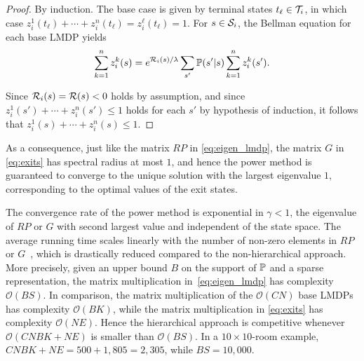 \begin{proof}
By induction. The base case is given by terminal states $t_\ell\in\mathcal{T}_i$, in which case $z_i^1(t_\ell)+\cdots+z_i^n(t_\ell) = z_i^\ell(t_\ell) = 1$. For $s\in\mathcal{S}_i$, the Bellman equation for each base LMDP yields
\begin{align*}
    \sum_{k=1}^n z_i^k(s)=e^{\mathcal{R}_i(s)/\lambda}\sum_{s'}\mathbb{P}(s'|s)\sum_{k=1}^n z_i^k(s').
\end{align*}


Since $\mathcal{R}_i(s)=\mathcal{R}(s)<0$ holds by assumption, and since $z_i^1(s')+\cdots+z_i^n(s')\leq 1$ holds for each $s'$ by hypothesis of induction, it follows that $z_i^1(s)+\cdots+z_i^n(s)\leq 1$.
\end{proof}
As a consequence, just like the matrix $RP$ in \eqref{eq:eigen_lmdp}, the matrix $G$ in \eqref{eq:exits} has spectral radius at most $1$, and hence the power method is guaranteed to converge to the unique solution with the largest eigenvalue $1$, corresponding to the optimal values of the exit states.

The convergence rate of the power method is exponential in $\gamma<1$, the eigenvalue of $RP$ or $G$ with second largest value and independent of the state space.
The average running time scales linearly with the number of non-zero elements in $RP$ or $G$~\citep{Todorov2006}, which is drastically reduced compared to the non-hierarchical approach. 
More precisely, given an upper bound $B$ on the support of $\mathbb{P}$ and a sparse representation, the matrix multiplication in~\eqref{eq:eigen_lmdp} has complexity $\mathcal{O}(BS)$. In comparison, the matrix multiplication of the $\mathcal{O}(CN)$ base LMDPs has complexity $\mathcal{O}(BK)$, while the matrix multiplication in \eqref{eq:exits} has complexity $\mathcal{O}(NE)$. Hence the hierarchical approach is competitive whenever $\mathcal{O}(CNBK+NE)$ is smaller than $\mathcal{O}(BS)$. In a $10\times 10$-room example, $CNBK+NE=500+1{,}805=2{,}305$, while $BS=10{,}000$.


